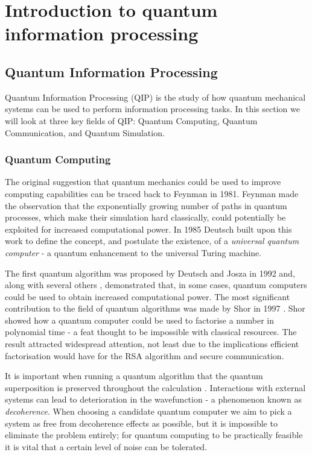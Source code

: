 \chapter{Introduction to quantum information processing} 
\label{ch:Introduction}

\section{Quantum Information Processing}

Quantum Information Processing (QIP) is the study of how quantum mechanical systems can be used to perform information processing tasks. In this section we will look at three key fields of QIP: Quantum Computing, Quantum Communication, and Quantum Simulation.

\subsection{Quantum Computing}

The original suggestion that quantum mechanics could be used to improve computing capabilities can be traced back to Feynman \cite{feynman_82} in 1981. Feynman made the observation that the exponentially growing number of paths in quantum processes, which make their simulation hard classically, could potentially be exploited for increased computational power. In 1985 Deutsch built upon this work to define the concept, and postulate the existence, of a \textit{universal quantum computer} \cite{deutsch_85} - a quantum enhancement to the universal Turing machine. 

The first quantum algorithm was proposed by Deutsch and Josza \cite{deutsch_jozsa_92} in 1992 and, along with several others \cite{simon_94, grovers_search}, demonstrated that, in some cases, quantum computers could be used to obtain increased computational power. The most significant contribution to the field of quantum algorithms was made by Shor in 1997 \cite{shors_algorithm}. Shor showed how a quantum computer could be used to factorise a number in polynomial time - a feat thought to be impossible with classical resources. The result attracted widespread attention, not least due to the implications efficient factorisation would have for the RSA algorithm \cite{rsa} and secure communication.

It is important when running a quantum algorithm that the quantum superposition is preserved throughout the calculation \cite{nature_cq_review_10}. Interactions with external systems can lead to deterioration in the wavefunction - a phenomenon known as \textit{decoherence}. When choosing a candidate quantum computer we aim to pick a system as free from decoherence effects as possible, but it is impossible to eliminate the problem entirely; for quantum computing to be practically feasible it is vital that a certain level of noise can be tolerated. 

